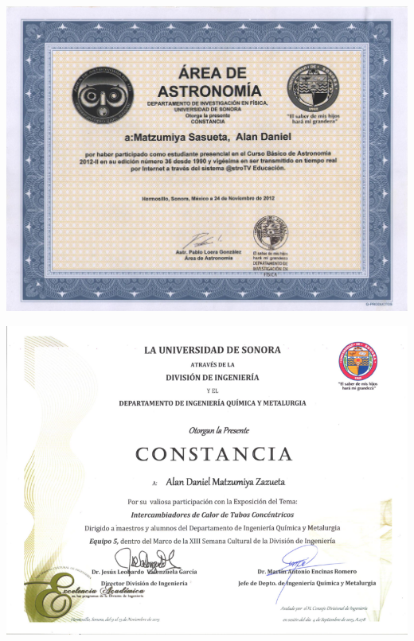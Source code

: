 \newpage

\colorbox{darkcol}{
\parbox{1.0\linewidth}{
	\colorbox{lightcol}{
		\parbox{0.98\linewidth}{
			\parbox{0.5\linewidth}{
				\includegraphics[width=1.0\linewidth]{../../docs/astronomy.jpeg}
				}
			\parbox{0.5\linewidth}{
				\includegraphics[width=1.0\linewidth]{../../docs/laboratory.png}
				}
			\parbox{0.5\linewidth}{
}}}}}
